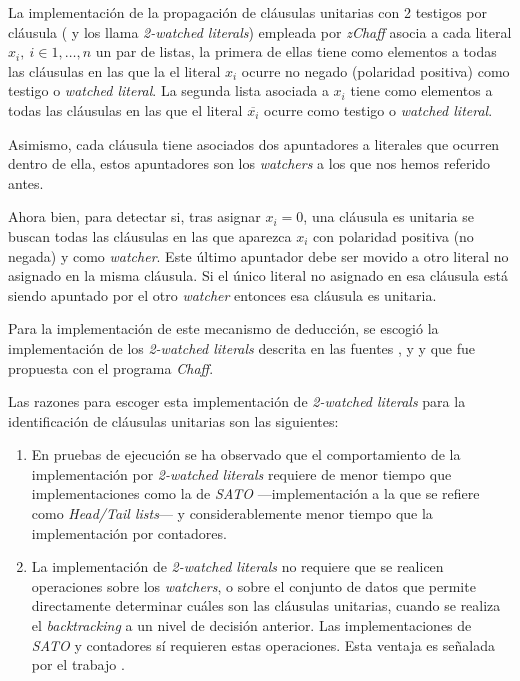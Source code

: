 \documentclass[12pt,lettersize,oneside]{article}
\begin{document}
La implementación de la propagación de cláusulas unitarias con 2 testigos por
cláusula (\cite{Zhang} y \cite{ZhangThesis} los llama \emph{2-watched literals})
empleada por \emph{zChaff} asocia a cada literal $x_i,\ i\in{1,\ldots,n}$ un par
de listas, la primera de ellas tiene como elementos a todas las cláusulas en las
que la el literal $x_i$ ocurre no negado (polaridad positiva) como testigo o
\emph{watched literal}. La segunda lista asociada a $x_i$ tiene como elementos a
todas las cláusulas en las que el literal $\overline{x_i}$ ocurre como testigo o
\emph{watched literal}.

Asimismo, cada cláusula tiene asociados dos apuntadores a literales que ocurren
dentro de ella, estos apuntadores son los \emph{watchers} a los que nos hemos
referido antes.

Ahora bien, para detectar si, tras asignar $x_i=0$, una cláusula
es unitaria se buscan todas las cláusulas en las que aparezca $x_i$ con
polaridad positiva (no negada) y como \emph{watcher}. Este último apuntador debe
ser movido a otro literal no asignado en la misma cláusula. Si el único literal
no asignado en esa cláusula está siendo apuntado por el otro \emph{watcher}
entonces esa cláusula es unitaria. 

Para la implementación de este mecanismo de deducción, se escogió la
implementación de los \emph{2-watched literals} descrita en las fuentes
\cite{Marques}, \cite{Zhang} y \cite{ZhangThesis} y que fue propuesta con el
programa \emph{Chaff}.



Las razones para escoger esta implementación de \emph{2-watched literals} para
la identificación de cláusulas unitarias son las siguientes:\vspace{-2.5mm}
\begin{enumerate}
\item En pruebas de ejecución\cite{Zhang} se ha observado que el comportamiento
  de la implementación por \emph{2-watched literals} requiere de menor tiempo
  que implementaciones como la de \emph{SATO} ---implementación a la que
  \cite{Zhang} se refiere como \emph{Head/Tail lists}--- y considerablemente
  menor tiempo que la implementación por contadores.
\item La implementación de \emph{2-watched literals} no requiere que se realicen
  operaciones sobre los \emph{watchers}, o sobre el conjunto de datos que
  permite directamente determinar cuáles son las cláusulas unitarias, cuando se
  realiza el \emph{backtracking} a un nivel de decisión anterior. Las
  implementaciones de \emph{SATO} y contadores sí requieren estas
  operaciones. Esta ventaja es señalada por el trabajo \cite{Marques}.
\end{enumerate}
\end{document}
